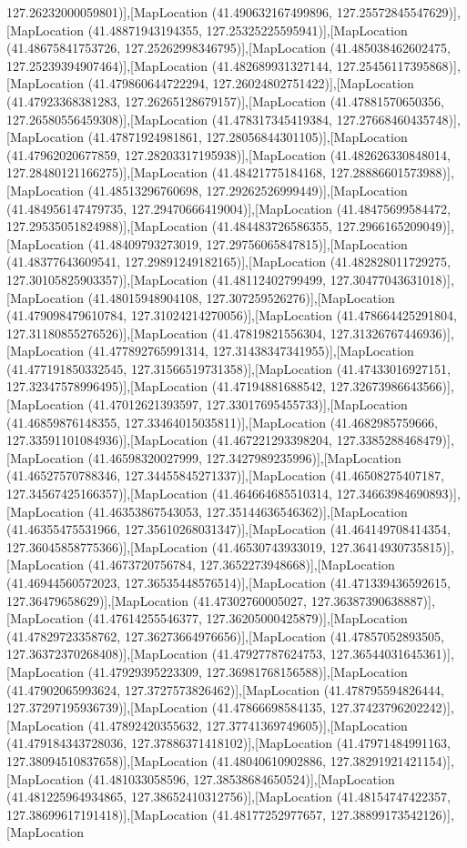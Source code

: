 127.26232000059801)],[MapLocation (41.490632167499896, 127.25572845547629)],[MapLocation (41.48871943194355, 127.25325225595941)],[MapLocation (41.48675841753726, 127.25262998346795)],[MapLocation (41.485038462602475, 127.25239394907464)],[MapLocation (41.482689931327144, 127.25456117395868)],[MapLocation (41.479860644722294, 127.26024802751422)],[MapLocation (41.47923368381283, 127.26265128679157)],[MapLocation (41.47881570650356, 127.26580556459308)],[MapLocation (41.478317345419384, 127.27668460435748)],[MapLocation (41.47871924981861, 127.28056844301105)],[MapLocation (41.47962020677859, 127.28203317195938)],[MapLocation (41.482626330848014, 127.28480121166275)],[MapLocation (41.48421775184168, 127.28886601573988)],[MapLocation (41.48513296760698, 127.29262526999449)],[MapLocation (41.484956147479735, 127.29470666419004)],[MapLocation (41.48475699584472, 127.29535051824988)],[MapLocation (41.484483726586355, 127.2966165209049)],[MapLocation (41.48409793273019, 127.29756065847815)],[MapLocation (41.48377643609541, 127.29891249182165)],[MapLocation (41.482828011729275, 127.30105825903357)],[MapLocation (41.48112402799499, 127.30477043631018)],[MapLocation (41.48015948904108, 127.307259526276)],[MapLocation (41.479098479610784, 127.31024214270056)],[MapLocation (41.478664425291804, 127.31180855276526)],[MapLocation (41.47819821556304, 127.31326767446936)],[MapLocation (41.477892765991314, 127.31438347341955)],[MapLocation (41.477191850332545, 127.31566519731358)],[MapLocation (41.47433016927151, 127.32347578996495)],[MapLocation (41.47194881688542, 127.32673986643566)],[MapLocation (41.47012621393597, 127.33017695455733)],[MapLocation (41.46859876148355, 127.33464015035811)],[MapLocation (41.4682985759666, 127.33591101084936)],[MapLocation (41.467221293398204, 127.3385288468479)],[MapLocation (41.46598320027999, 127.3427989235996)],[MapLocation (41.46527570788346, 127.34455845271337)],[MapLocation (41.46508275407187, 127.34567425166357)],[MapLocation (41.464664685510314, 127.34663984690893)],[MapLocation (41.46353867543053, 127.35144636546362)],[MapLocation (41.46355475531966, 127.35610268031347)],[MapLocation (41.464149708414354, 127.36045858775366)],[MapLocation (41.46530743933019, 127.36414930735815)],[MapLocation (41.4673720756784, 127.3652273948668)],[MapLocation (41.46944560572023, 127.36535448576514)],[MapLocation (41.471339436592615, 127.36479658629)],[MapLocation (41.47302760005027, 127.36387390638887)],[MapLocation (41.47614255546377, 127.36205000425879)],[MapLocation (41.47829723358762, 127.36273664976656)],[MapLocation (41.47857052893505, 127.36372370268408)],[MapLocation (41.47927787624753, 127.36544031645361)],[MapLocation (41.47929395223309, 127.36981768156588)],[MapLocation (41.47902065993624, 127.3727573826462)],[MapLocation (41.478795594826444, 127.37297195936739)],[MapLocation (41.47866698584135, 127.37423796202242)],[MapLocation (41.47892420355632, 127.37741369749605)],[MapLocation (41.479184343728036, 127.37886371418102)],[MapLocation (41.47971484991163, 127.38094510837658)],[MapLocation (41.48040610902886, 127.38291921421154)],[MapLocation (41.481033058596, 127.38538684650524)],[MapLocation (41.481225964934865, 127.38652410312756)],[MapLocation (41.48154747422357, 127.38699617191418)],[MapLocation (41.48177252977657, 127.38899173542126)],[MapLocation 